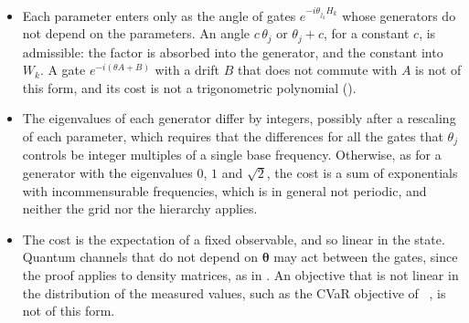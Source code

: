 \documentclass[handoutsbeamer.tex]{subfiles}
\begin{document}
\begin{frame}
\end{frame}

\begin{frame}
\onp{\footnotesize}
\begin{itemize}\setlength\itemsep{0.3em}
    \item Each parameter enters only as the angle of gates $e^{-i\theta_{j_k}H_k}$ whose generators do not depend on the parameters. An angle $c\,\theta_j$ or $\theta_j+c$, for a constant $c$, is admissible: the factor is absorbed into the generator, and the constant into $W_k$. A gate $e^{-i(\theta A+B)}$ with a drift $B$ that does not commute with $A$ is not of this form, and its cost is not a trigonometric polynomial ().
    \item The eigenvalues of each generator differ by integers, possibly after a rescaling of each parameter, which requires that the differences for all the gates that $\theta_j$ controls be integer multiples of a single base frequency. Otherwise, as for a generator with the eigenvalues $0$, $1$ and $\sqrt2$, the cost is a sum of exponentials with incommensurable frequencies, which is in general not periodic, and neither the grid nor the hierarchy applies.
    \item The cost is the expectation of a fixed observable, and so linear in the state. Quantum channels that do not depend on $\boldsymbol\theta$ may act between the gates, since the proof applies to density matrices, as in . An objective that is not linear in the distribution of the measured values, such as the CVaR objective of \Chap~, is not of this form.
\end{itemize}
\end{frame}
\end{document}
